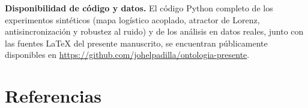 \documentclass[11pt,a4paper]{article}
\begin{document}
\noindent\textbf{Disponibilidad de código y datos.} El código Python completo de los experimentos sintéticos (mapa logístico acoplado, atractor de Lorenz, antisincronización y robustez al ruido) y de los análisis en datos reales, junto con las fuentes LaTeX del presente manuscrito, se encuentran públicamente disponibles en \url{https://github.com/johelpadilla/ontologia-presente}.

\section*{Referencias}

\sloppy

\normalfont
\end{document}
